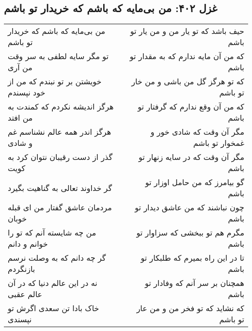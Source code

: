 \begin{center}
\section*{غزل ۴۰۲: من بی‌مایه که باشم که خریدار تو باشم}
\label{sec:402}
\begin{longtable}{l p{0.5cm} r}
من بی‌مایه که باشم که خریدار تو باشم
&&
حیف باشد که تو یار من و من یار تو باشم
\\
تو مگر سایه لطفی به سر وقت من آری
&&
که من آن مایه ندارم که به مقدار تو باشم
\\
خویشتن بر تو نبندم که من از خود نپسندم
&&
که تو هرگز گل من باشی و من خار تو باشم
\\
هرگز اندیشه نکردم که کمندت به من افتد
&&
که من آن وقع ندارم که گرفتار تو باشم
\\
هرگز اندر همه عالم نشناسم غم و شادی
&&
مگر آن وقت که شادی خور و غمخوار تو باشم
\\
گذر از دست رقیبان نتوان کرد به کویت
&&
مگر آن وقت که در سایه زنهار تو باشم
\\
گر خداوند تعالی به گناهیت بگیرد
&&
گو بیامرز که من حامل اوزار تو باشم
\\
مردمان عاشق گفتار من ای قبله خوبان
&&
چون نباشند که من عاشق دیدار تو باشم
\\
من چه شایسته آنم که تو را خوانم و دانم
&&
مگرم هم تو ببخشی که سزاوار تو باشم
\\
گر چه دانم که به وصلت نرسم بازنگردم
&&
تا در این راه بمیرم که طلبکار تو باشم
\\
نه در این عالم دنیا که در آن عالم عقبی
&&
همچنان بر سر آنم که وفادار تو باشم
\\
خاک بادا تن سعدی اگرش تو نپسندی
&&
که نشاید که تو فخر من و من عار تو باشم
\\
\end{longtable}
\end{center}
